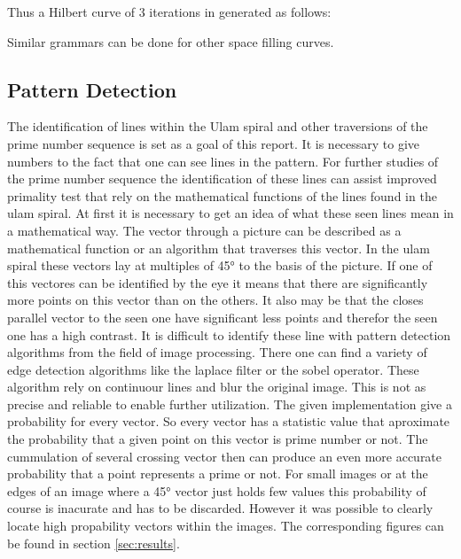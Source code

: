 Thus a Hilbert curve of 3 iterations in generated as follows:

Similar grammars can be done for other space filling curves.

\subsection{Pattern Detection}
\label{sec:pattern}
The identification of lines within the Ulam spiral and other traversions of the prime number sequence is set as a goal of this report. It is necessary to give numbers to the fact that one can see lines in the pattern. For further studies of the prime number sequence the identification of these lines can assist improved primality test that rely on the mathematical functions of the lines found in the ulam spiral.
At first it is necessary to get an idea of what these seen lines mean in a mathematical way. The vector through a picture can be described as a mathematical function or an algorithm that traverses this vector. In the ulam spiral these vectors lay at multiples of 45° to the basis of the picture.
If one of this vectores can be identified by the eye it means that there are significantly more points on this vector than on the others. It also may be that the closes parallel vector to the seen one have significant less points and therefor the seen one has a high contrast.
It is difficult to identify these line with pattern detection algorithms from the field of image processing. There one can find a variety of edge detection algorithms like the laplace filter or the sobel operator. These algorithm rely on continuour lines and blur the original image. This is not as precise and reliable to enable further utilization.
The given implementation give a probability for every vector. So every vector has a statistic value that aproximate the probability that a given point on this vector is prime number or not. The cummulation of several crossing vector then can produce an even more accurate probability that a point represents a prime or not.
For small images or at the edges of an image where a 45° vector just holds few values this probability of course is inacurate and has to be discarded. However it was possible to clearly locate high propability vectors within the images. The corresponding figures can be found in section \ref{sec:results}.

